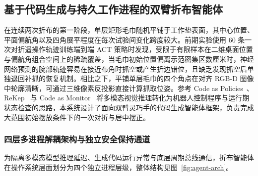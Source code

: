 \subsection{基于代码生成与持久工作进程的双臂折布智能体}
\label{subsec:agent-harness}

在连续两次折布的第一阶段，单层矩形毛巾随机平铺于工作垫表面，其中心位置、平面偏航角以及四角展平程度在每次试验间变化跨度较大。前期实验使用 60 条一次对折遥操作轨迹训练端到端 ACT 策略时发现，受限于有限样本在二维桌面位置与偏航角组合空间上的稀疏覆盖，当毛巾初始位置偏离示范密集区数厘米时，神经网络预测的腕部轨迹容易在接近布角时抓空或产生折边错位，且缺乏发现抓空后单独退回补抓的恢复机制。相比之下，平铺单层毛巾的四个角点在对齐 RGB-D 图像中轮廓清晰，可通过三维像素反投影直接计算抓取位姿。参考 Code as Policies~\cite{liang2023code}、ReKep~\cite{huang2024rekep} 与 Code as Monitor~\cite{zhou2024code} 将多模态视觉推理转化为机器人控制程序与运行期状态检查的思路，本系统设计了面向双臂灵巧手的代码生成智能体框架，负责完成大范围初始摆放条件下的一次对折与居中摆正。

\subsubsection{四层多进程解耦架构与独立安全保持通道}

为隔离多模态模型推理延迟、生成代码运行异常与底层周期总线通信，折布智能体在操作系统层面划分为四个独立进程层级，整体结构见图~\ref{fig:agent-arch}。

